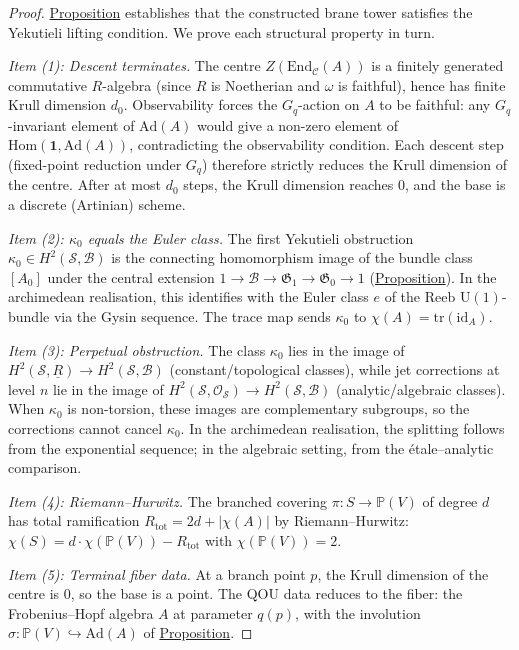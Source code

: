 \begin{proof}
\hyperref[prop:yekutieli-lifting]{Proposition} establishes that the constructed
brane tower satisfies the Yekutieli lifting condition.  We prove each
structural property in turn.

\emph{Item (1): Descent terminates.}
The centre $Z(\mathrm{End}_{\mathcal{C}}(A))$ is a finitely generated
commutative $R$-algebra (since $R$ is Noetherian and $\omega$ is faithful),
hence has finite Krull dimension $d_0$.  Observability forces the $G_q$-action
on $A$ to be faithful: any $G_q$-invariant element of $\mathrm{Ad}(A)$ would
give a non-zero element of $\mathrm{Hom}(\mathbf{1}, \mathrm{Ad}(A))$,
contradicting the observability condition.  Each descent step (fixed-point
reduction under $G_q$) therefore strictly reduces the Krull dimension of the
centre.  After at most $d_0$ steps, the Krull dimension reaches $0$, and the
base is a discrete (Artinian) scheme.

\emph{Item (2): $\kappa_0$ equals the Euler class.}
The first Yekutieli obstruction $\kappa_0 \in H^2(\mathcal{S}, \mathcal{B})$
is the connecting homomorphism image of the bundle class $[A_0]$ under the
central extension $1 \to \mathcal{B} \to \mathfrak{G}_1 \to \mathfrak{G}_0
\to 1$ (\hyperref[prop:yekutieli-lifting]{Proposition}).  In the archimedean
realisation, this identifies with the Euler class $e$ of the Reeb
$\mathrm{U}(1)$-bundle via the Gysin sequence.  The trace map sends
$\kappa_0$ to $\chi(A) = \mathrm{tr}(\mathrm{id}_A)$.

\emph{Item (3): Perpetual obstruction.}
The class $\kappa_0$ lies in the image of $H^2(\mathcal{S}, \underline{R})
\to H^2(\mathcal{S}, \mathcal{B})$ (constant/topological classes), while jet
corrections at level $n$ lie in the image of $H^2(\mathcal{S},
\mathcal{O}_{\mathcal{S}}) \to H^2(\mathcal{S}, \mathcal{B})$ (analytic/algebraic
classes).  When $\kappa_0$ is non-torsion, these images are complementary
subgroups, so the corrections cannot cancel $\kappa_0$.  In the archimedean
realisation, the splitting follows from the exponential sequence; in the
algebraic setting, from the étale--analytic comparison.

\emph{Item (4): Riemann--Hurwitz.}
The branched covering $\pi \colon S \to \mathbb{P}(V)$ of degree $d$ has
total ramification $R_{\mathrm{tot}} = 2d + \lvert\chi(A)\rvert$ by
Riemann--Hurwitz: $\chi(S) = d \cdot \chi(\mathbb{P}(V)) - R_{\mathrm{tot}}$
with $\chi(\mathbb{P}(V)) = 2$.

\emph{Item (5): Terminal fiber data.}
At a branch point $p$, the Krull dimension of the centre is $0$, so the base
is a point.  The QOU data reduces to the fiber: the Frobenius--Hopf
algebra $A$ at parameter $q(p)$, with the involution
$\sigma \colon \mathbb{P}(V) \hookrightarrow \mathrm{Ad}(A)$ of
\hyperref[prop:fiber-adjoint-involution]{Proposition}.
\end{proof}

